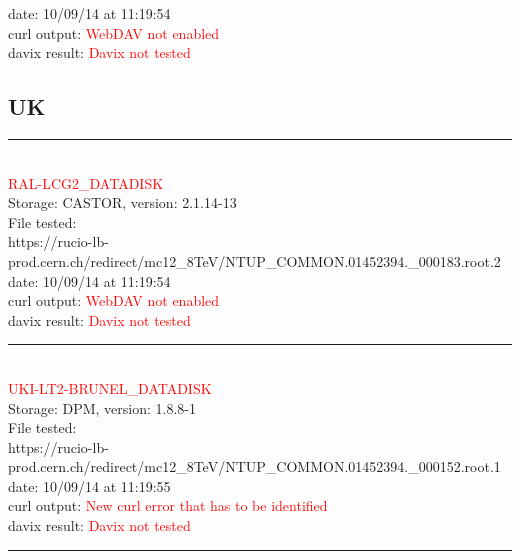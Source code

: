 date: 10/09/14 at 11:19:54\\

curl output:  \textcolor{red}{WebDAV not enabled}\\

davix result:  \textcolor{red}{Davix not tested}\\

\subsection{UK}

\rule{\textwidth}{1pt}\\

\textcolor{red}{\normalsize{RAL-LCG2\_DATADISK}}\\

Storage: CASTOR, version: 2.1.14-13\\

File tested:\\
\footnotesize{https://rucio-lb-prod.cern.ch/redirect/mc12\_8TeV/NTUP\_COMMON.01452394.\_000183.root.2}\\

date: 10/09/14 at 11:19:54\\

curl output:  \textcolor{red}{WebDAV not enabled}\\

davix result:  \textcolor{red}{Davix not tested}\\

\rule{\textwidth}{1pt}\\

\textcolor{red}{\normalsize{UKI-LT2-BRUNEL\_DATADISK}}\\

Storage: DPM, version: 1.8.8-1\\

File tested:\\
\footnotesize{https://rucio-lb-prod.cern.ch/redirect/mc12\_8TeV/NTUP\_COMMON.01452394.\_000152.root.1}\\

date: 10/09/14 at 11:19:55\\

curl output:  \textcolor{red}{New curl error that has to be identified}\\

davix result:  \textcolor{red}{Davix not tested}\\

\rule{\textwidth}{1pt}\\

